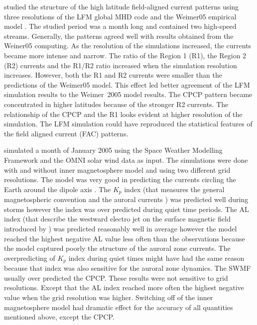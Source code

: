 \documentclass[linenumbers,draft]{agujournal}
\begin{document}
\citet{wiltberger17:_struc_high_latit_curren_magnet_ionos_model} studied the structure of the high latitude field-aligned current patterns using three resolutions of the LFM global MHD code and the Weimer05 empirical model \citep{weimer05:_improv_joule}. The studied period was a month long and contained two high-speed streams. Generally, the patterns agreed well with results obtained from the Weiner05 computing. As the resolution of the simulations increased, the currents became more intense and narrow. The ratio of the Region 1 (R1), the Region 2 (R2) currents and the R1/R2 ratio increased when the simulation resolution increases. However, both the R1 and R2 currents were smaller than the predictions of the Weimer05 model. This effect led better agreement of the LFM simulation results to the Weimer~2005 model results. The CPCP pattern became concentrated in higher latitudes because of the stronger R2 currents. The relationship of the CPCP and the R1 looks evident at higher resolution of the simulation. The LFM simulation could have reproduced the statistical features of the field aligned current (FAC) patterns. 

\citet{haiducek17:_swmf_global_magnet_simul_januar} simulated a month of January 2005 using the Space Weather Modelling Framework \citep[SWMF;][]{toth05:_space_weath_model_framew} and the OMNI solar wind data as input. The simulations were done with and without inner magnetosphere model and using two different grid resolutions. The model was very good in predicting the currents circling the Earth around the dipole axis \citep[SYM-H; http://wdc.kugi.kyoto-u.ac.jp/aeasy/asy.pdf;][]{iyemori90:_storm}. The $K_p$ index (that measures the general magnetospheric convention and the auroral currents \citep{bartels39,rostoker72:_geomag,thomsen04:_why_kp}) was predicted well during storms however the index was over predicted during quiet time periods. The AL index (that describe the westward electro jet on the surface magnetic field introduced by \citet{davis66:_auror_ae}) was predicted reasonably well in average however the model reached the highest negative AL value less often than the observations because the model captured poorly the structure of the auroral zone currents. The overpredicting of $K_p$ index during quiet times might have had the same reason because that index was also sensitive for the auroral zone dynamics. The SWMF usually over predicted the CPCP. These results were not sensitive to grid resolutions. Except that the AL index reached more often the highest negative value when the grid resolution was higher. Switching off of the inner magnetosphere model had dramatic effect for the accuracy of all quantities mentioned above, except the CPCP. 
\end{document}
